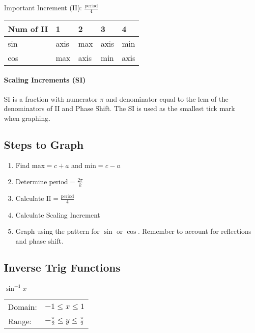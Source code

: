 \documentclass{article}
\numberwithin{equation}{section}
\begin{document}
\noindent
Important Increment (II): $\frac{\mathrm{period}}{4}$

\bigskip
\noindent
\begin{tabularx}{\textwidth}{ X | X | X | X | X }
	Num of II & 1 & 2 & 3 & 4 \\ \hline
	sin & axis & max & axis & min \\ \hline
	cos & max & axis & min & axis
\end{tabularx}

\paragraph{Scaling Increments (SI)}
SI is a fraction with numerator $\pi$ and denominator equal to the lcm of the denominators of II and Phase Shift. The SI is used as the smallest tick mark when graphing.

\subsection{Steps to Graph}
\begin{enumerate}
	\item Find $\mathrm{max}=c+a$ and $\mathrm{min}=c-a$ \\
	\item Determine $\mathrm{period}=\frac{2\pi}{k}$ \\
	\item Calculate $\mathrm{II}=\frac{\mathrm{period}}{4}$ \\
	\item Calculate Scaling Increment \\
	\item Graph using the pattern for $\sin$ or $\cos$. Remember to account for reflections and phase shift.
\end{enumerate}



\subsection{Inverse Trig Functions}

\paragraph{$\sin ^{-1} x$}
\begin{tabular}{l l}
	Domain: & $-1 \le x \le 1$\\
	Range: & $-\frac{\pi}{2} \le y \le \frac{\pi}{2}$ \\
\end{tabular}
\end{document}
